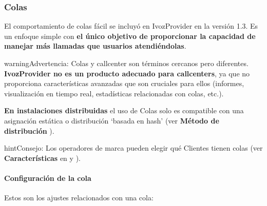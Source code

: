 \documentclass[letterpaper,10pt,spanish]{sphinxmanual}
\begin{document}
\subsubsection{Colas}
\label{administration_portal/client/vpbx/routing_endpoints/queues:queues}\label{administration_portal/client/vpbx/routing_endpoints/queues::doc}\label{administration_portal/client/vpbx/routing_endpoints/queues:id1}
El comportamiento de colas fácil se incluyó en IvozProvider en la versión 1.3. Es un enfoque simple con \textbf{el único objetivo de proporcionar la capacidad de manejar más llamadas que usuarios atendiéndolas}.

\begin{notice}{warning}{Advertencia:}
Colas y callcenter son términos cercanos pero diferentes. \textbf{IvozProvider no es un producto adecuado para callcenters}, ya que no proporciona características avanzadas que son cruciales para ellos (informes, visualización en tiempo real, estadísticas relacionadas con colas, etc.).
\end{notice}

\textbf{En instalaciones distribuidas} el uso de Colas solo es compatible con una asignación estática o distribución `basada en hash' (ver \textbf{Método de distribución} {\hyperref[administration_portal/brand/clients/virtual_pbx:virtual\string-pbx]{}}).

\begin{notice}{hint}{Consejo:}
Los operadores de marca pueden elegir qué Clientes tienen colas (ver \textbf{Características} en {\hyperref[getting_started/internal_calls/brand_portal:brand\string-configuration]{}} y {\hyperref[getting_started/internal_calls/client_portal:client\string-configuration]{}}).
\end{notice}


\paragraph{Configuración de la cola}
\label{administration_portal/client/vpbx/routing_endpoints/queues:queue-configuration}
Estos son los ajustes relacionados con una cola:
\end{document}
